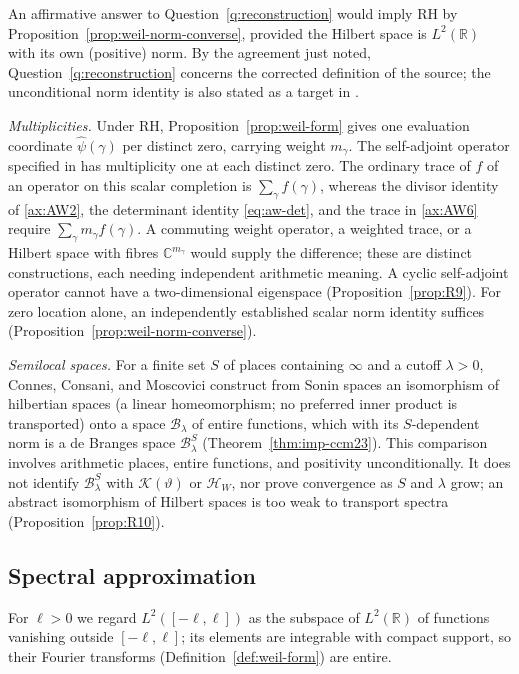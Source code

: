\documentclass[11pt]{amsart}
\theoremstyle{plain}
\theoremstyle{definition}
\theoremstyle{remark}
\numberwithin{equation}{section}
\newcommand{\C}{\mathbb{C}}
\newcommand{\R}{\mathbb{R}}
\begin{document}
An affirmative answer to Question~\ref{q:reconstruction} would imply RH
by Proposition~\ref{prop:weil-norm-converse}, provided the Hilbert space
is $L^2(\R)$ with its own (positive) norm.
By the agreement just noted, Question~\ref{q:reconstruction} concerns
the corrected definition of the source; the unconditional norm identity
is also stated as a target in \cite[pp.~26--27]{Suzuki2026WeilScrew}.

\emph{Multiplicities.} Under RH, Proposition~\ref{prop:weil-form} gives
one evaluation coordinate $\widehat\psi(\gamma)$ per distinct zero,
carrying weight $m_\gamma$. The self-adjoint operator specified in
\cite[\S6]{Suzuki2023WeilHilbert} has multiplicity one at each distinct
zero. The ordinary trace of $f$ of an operator on this scalar completion
is $\sum_\gamma f(\gamma)$, whereas the divisor identity of
\ref{ax:AW2}, the determinant identity \eqref{eq:aw-det}, and the trace in
\ref{ax:AW6} require
$\sum_\gamma m_\gamma f(\gamma)$. A commuting weight operator, a
weighted trace, or a Hilbert space with fibres $\C^{m_\gamma}$ would
supply the difference; these are distinct constructions, each needing
independent arithmetic meaning. A cyclic self-adjoint operator cannot
have a two-dimensional eigenspace (Proposition~\ref{prop:R9}). For zero
location alone, an independently established scalar norm identity
suffices (Proposition~\ref{prop:weil-norm-converse}).

\emph{Semilocal spaces.} For a finite set $S$ of places containing
$\infty$ and a cutoff $\lambda>0$, Connes, Consani, and Moscovici
construct from Sonin spaces an isomorphism of hilbertian spaces (a
linear homeomorphism; no preferred inner product is transported) onto
a space $\mathcal B_\lambda$ of entire functions, which with its
$S$-dependent norm is a de Branges space $\mathcal B_\lambda^S$
(Theorem~\ref{thm:imp-ccm23}). This comparison involves arithmetic
places, entire functions, and positivity unconditionally. It does not
identify $\mathcal B_\lambda^S$ with $\mathcal K(\vartheta)$ or
$\mathcal H_W$, nor prove convergence as $S$ and $\lambda$ grow; an
abstract isomorphism of Hilbert spaces is too weak to transport spectra
(Proposition~\ref{prop:R10}).

\subsection{Spectral approximation}\label{subsec:gap}

For $\ell>0$ we regard $L^2([-\ell,\ell])$ as the subspace of
$L^2(\R)$ of functions vanishing outside $[-\ell,\ell]$; its elements
are integrable with compact support, so their Fourier transforms
(Definition~\ref{def:weil-form}) are entire.
\end{document}

